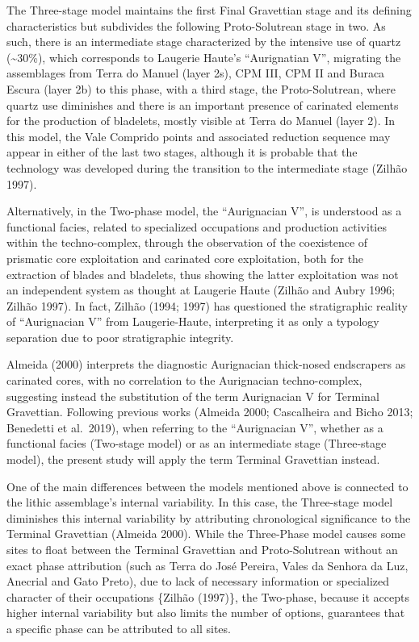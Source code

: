 \documentclass[12pt,twoside]{reedthesis}
\begin{document}
The Three-stage model maintains the first Final Gravettian stage and its defining characteristics but subdivides the following Proto-Solutrean stage in two. As such, there is an intermediate stage characterized by the intensive use of quartz (\textasciitilde30\%), which corresponds to Laugerie Haute's ``Aurignatian V'', migrating the assemblages from Terra do Manuel (layer 2s), CPM III, CPM II and Buraca Escura (layer 2b) to this phase, with a third stage, the Proto-Solutrean, where quartz use diminishes and there is an important presence of carinated elements for the production of bladelets, mostly visible at Terra do Manuel (layer 2). In this model, the Vale Comprido points and associated reduction sequence may appear in either of the last two stages, although it is probable that the technology was developed during the transition to the intermediate stage (Zilhão 1997).

Alternatively, in the Two-phase model, the ``Aurignacian V'', is understood as a functional facies, related to specialized occupations and production activities within the techno-complex, through the observation of the coexistence of prismatic core exploitation and carinated core exploitation, both for the extraction of blades and bladelets, thus showing the latter exploitation was not an independent system as thought at Laugerie Haute (Zilhão and Aubry 1996; Zilhão 1997). In fact, Zilhão (1994; 1997) has questioned the stratigraphic reality of ``Aurignacian V'' from Laugerie-Haute, interpreting it as only a typology separation due to poor stratigraphic integrity.

Almeida (2000) interprets the diagnostic Aurignacian thick-nosed endscrapers as carinated cores, with no correlation to the Aurignacian techno-complex, suggesting instead the substitution of the term Aurignacian V for Terminal Gravettian. Following previous works (Almeida 2000; Cascalheira and Bicho 2013; Benedetti et al.~2019), when referring to the ``Aurignacian V'', whether as a functional facies (Two-stage model) or as an intermediate stage (Three-stage model), the present study will apply the term Terminal Gravettian instead.

One of the main differences between the models mentioned above is connected to the lithic assemblage's internal variability. In this case, the Three-stage model diminishes this internal variability by attributing chronological significance to the Terminal Gravettian (Almeida 2000). While the Three-Phase model causes some sites to float between the Terminal Gravettian and Proto-Solutrean without an exact phase attribution (such as Terra do José Pereira, Vales da Senhora da Luz, Anecrial and Gato Preto), due to lack of necessary information or specialized character of their occupations \{Zilhão (1997)\}, the Two-phase, because it accepts higher internal variability but also limits the number of options, guarantees that a specific phase can be attributed to all sites.
\end{document}
